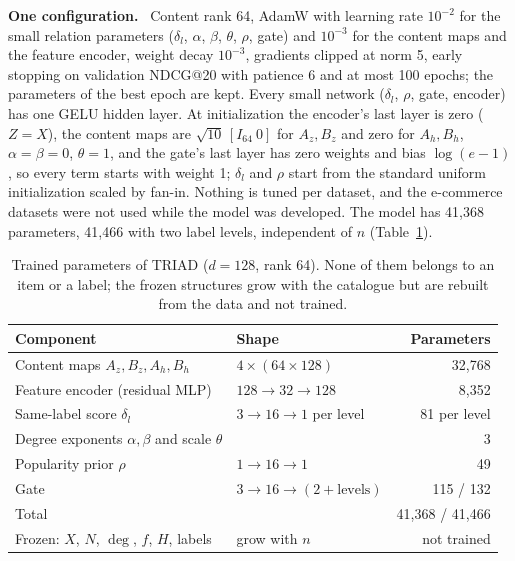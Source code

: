 \documentclass[runningheads]{llncs}
\newcommand{\deltab}{\delta}
\renewcommand{\paragraph}[1]{\smallskip\noindent\textbf{#1}\ }
\begin{document}
\paragraph{One configuration.} Content rank 64, AdamW \cite{adamw} with learning rate $10^{-2}$ for the small
relation parameters ($\deltab_l$, $\alpha$, $\beta$, $\theta$, $\rho$, gate) and $10^{-3}$ for the content maps and
the feature encoder, weight decay $10^{-3}$, gradients clipped at norm 5, early stopping on validation NDCG@20 with
patience 6 and at most 100 epochs; the parameters of the best epoch are kept. Every small network ($\deltab_l$, $\rho$,
gate, encoder) has one GELU hidden layer. At initialization the encoder's last layer is zero ($Z=X$), the content maps
are $\sqrt{10}\,[I_{64}\ 0]$ for $A_z,B_z$ and zero for $A_h,B_h$, $\alpha=\beta=0$, $\theta=1$, and the gate's last layer
has zero weights and bias $\log(e-1)$, so every term starts with weight 1; $\deltab_l$ and $\rho$ start from the standard
uniform initialization scaled by fan-in. Nothing is tuned per dataset, and the e-commerce datasets were not used while
the model was developed. The model has 41,368 parameters, 41,466 with two label levels, independent of $n$
(Table~\ref{tab:params}).

\begin{table}[t]
\centering
\caption{Trained parameters of TRIAD ($d=128$, rank 64). None of them belongs to an item or a label; the frozen
structures grow with the catalogue but are rebuilt from the data and not trained.}
\label{tab:params}
\setlength{\tabcolsep}{4pt}
\small
\begin{tabular}{llr}
\toprule
Component & Shape & Parameters\\
\midrule
Content maps $A_z,B_z,A_h,B_h$ & $4\times(64\times128)$ & 32,768\\
Feature encoder (residual MLP) & $128\to32\to128$ & 8,352\\
Same-label score $\deltab_l$ & $3\to16\to1$ per level & 81 per level\\
Degree exponents $\alpha,\beta$ and scale $\theta$ & & 3\\
Popularity prior $\rho$ & $1\to16\to1$ & 49\\
Gate & $3\to16\to(2+\text{levels})$ & 115 / 132\\
\midrule
Total & & 41,368 / 41,466\\
Frozen: $X$, $N$, $\deg$, $f$, $H$, labels & grow with $n$ & not trained\\
\bottomrule
\end{tabular}
\end{table}
\end{document}
